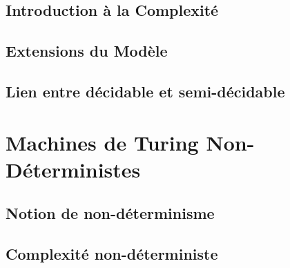 \documentclass[9pt]{beamer}
\begin{document}
\subsection{Introduction à la Complexité}







 
\subsection{Extensions du Modèle}





 
\subsection{Lien entre décidable et semi-décidable}

 
\section{Machines de Turing Non-Déterministes}
 
\subsection{Notion de non-déterminisme}






 
\subsection{Complexité non-déterministe}




 
\end{document}
